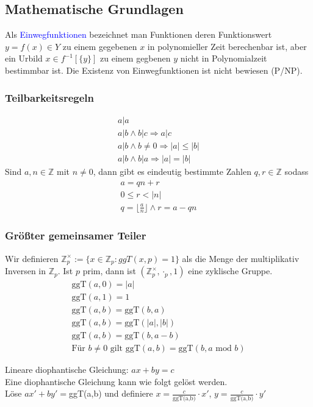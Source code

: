 \documentclass[a4paper,12pt,leqno]{article}
\newcommand{\blue}[1]{\textcolor{blue}{#1}}
\begin{document}
\subsection{Mathematische Grundlagen}
\label{def:Einwegfunktion}
Als \blue{Einwegfunktionen} bezeichnet man Funktionen deren Funktionswert $y = f(x)\in Y$ zu einem gegebenen $x$ in polynomieller Zeit berechenbar ist, aber ein Urbild $x\in f^{-1}[\{y\}]$ zu einem gegbenen $y$ nicht in Polynomialzeit bestimmbar ist. Die Existenz von Einwegfunktionen ist nicht bewiesen (P/NP).
\subsubsection{Teilbarkeitsregeln}
\begin{align}
a | a\\
a | b \wedge b |c \Rightarrow a|c\\
a|b\wedge b\neq 0 \Rightarrow |a|\leq |b|\\
a | b\wedge b|a \Rightarrow |a| = |b|
\end{align}
Sind $a,n\in\mathbb{Z}$ mit $n\neq 0$, dann gibt es eindeutig bestimmte Zahlen $q,r\in\mathbb{Z}$ sodass
\begin{align*}
a= qn+r\\
0\leq r < |n|\\
q = \lfloor \frac{a}{n} \rfloor \wedge r = a -qn
\end{align*}
\subsubsection{Größter gemeinsamer Teiler}
\label{sec:euklid}
Wir definieren $\mathbb{Z}_p^\times:=\{x\in\mathbb{Z}_p : ggT(x,p)=1\}$ als die Menge der multiplikativ Inversen in $\mathbb{Z}_p$. Ist $p$ prim, dann ist $(\mathbb{Z}_p^\times,\cdot_p,1)$ eine zyklische Gruppe.
\begin{align}
\textrm{ggT}(a,0)=|a|\\
\textrm{ggT}(a,1)=1\\
\textrm{ggT}(a,b)=\textrm{ggT}(b,a)\\
\textrm{ggT}(a,b)=\textrm{ggT}(|a|,|b|)\\
\textrm{ggT}(a,b)=\textrm{ggT}(b,a-b)\\
\textrm{Für } b\neq 0 \textrm{ gilt } \textrm{ggT}(a,b)=\textrm{ggT}(b,a \textrm{ mod } b)
\end{align}

Lineare diophantische Gleichung: $ax+by=c$\\
Eine diophantische Gleichung kann wie folgt gelöst werden.\\
Löse $ax'+by'=$ggT(a,b) und definiere $x=\frac{c}{\textrm{ggT(a,b)}}\cdot x'$, $y=\frac{c}{\textrm{ggT(a,b)}}\cdot y'$
\end{document}
